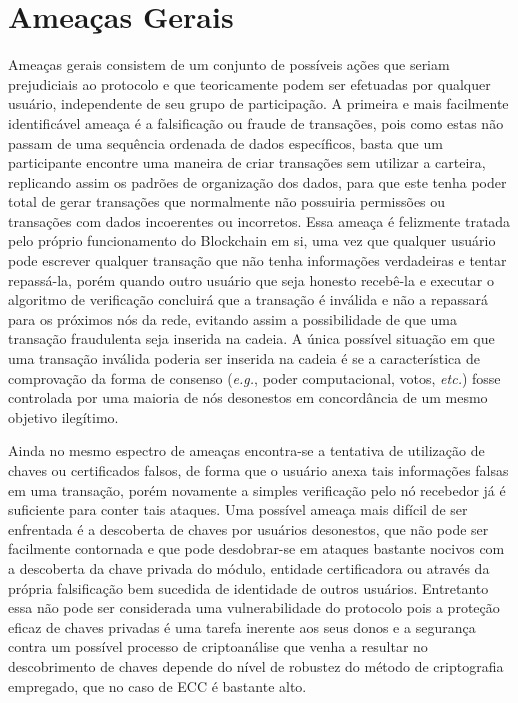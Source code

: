 \section{Ameaças Gerais}
\label{sec:ameacas_gerais}

Ameaças gerais consistem de um conjunto de possíveis ações que seriam prejudiciais ao protocolo e que teoricamente podem ser efetuadas por qualquer usuário, independente de seu grupo de participação. A primeira e mais facilmente identificável ameaça é a falsificação ou fraude de transações, pois como estas não passam de uma sequência ordenada de dados específicos, basta que um participante encontre uma maneira de criar transações sem utilizar a carteira, replicando assim os padrões de organização dos dados, para que este tenha poder total de gerar transações que normalmente não possuiria permissões ou transações com dados incoerentes ou incorretos. Essa ameaça é felizmente tratada pelo próprio funcionamento do Blockchain em si, uma vez que qualquer usuário pode escrever qualquer transação que não tenha informações verdadeiras e tentar repassá-la, porém quando outro usuário que seja honesto recebê-la e executar o algoritmo de verificação 
concluirá que a transação é inválida e não a repassará para os próximos nós da rede, evitando assim a possibilidade de que uma transação fraudulenta seja inserida na cadeia. A única possível situação em que uma transação inválida poderia ser inserida na cadeia é se a característica de comprovação da forma de consenso (\textit{e.g.}, poder computacional, votos, \textit{etc.}) fosse controlada por uma maioria de nós desonestos em concordância de um mesmo objetivo ilegítimo.

%
Ainda no mesmo espectro de ameaças encontra-se a tentativa de utilização de chaves ou certificados falsos, de forma que o usuário anexa tais informações falsas em uma transação, porém novamente a simples verificação pelo nó recebedor já é suficiente para conter tais ataques. Uma possível ameaça mais difícil de ser enfrentada é a descoberta de chaves por usuários desonestos, que não pode ser facilmente contornada e que pode desdobrar-se em ataques bastante nocivos com a descoberta da chave privada do módulo, entidade certificadora ou através da própria falsificação bem sucedida de identidade de outros usuários. Entretanto essa não pode ser considerada uma vulnerabilidade do protocolo pois a proteção eficaz de chaves privadas é uma tarefa inerente aos seus donos e a segurança contra um possível processo de criptoanálise que venha a resultar no descobrimento de chaves depende do nível de robustez do método de criptografia empregado, que no caso de \ac{ECC} é bastante alto. 

